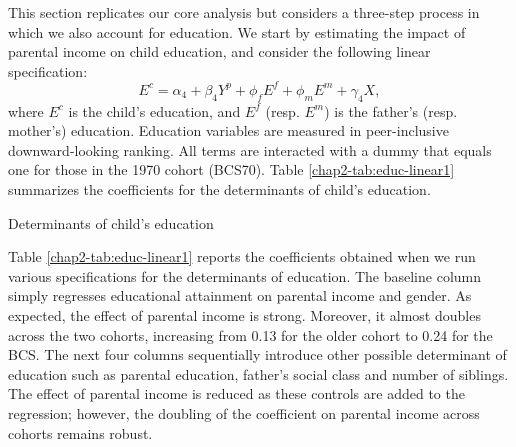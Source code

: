 This section replicates our core analysis but considers a three-step process in which we also account for education. We start by estimating the impact of parental income on child education, and consider the following linear specification:
\begin{equation}\label{chap2-eq:emp-educ0}
    E^c = \alpha_4 + \beta_4 Y^p + \phi_f E^f + \phi_m E^m + \gamma_4 X,
\end{equation}
where $E^c$ is the child's education, and $E^f$ (resp. $E^m$) is the father's (resp. mother's) education. Education variables are measured in peer-inclusive downward-looking ranking. All terms are
interacted with a dummy that equals one for those in the 1970 cohort (BCS70).
Table \ref{chap2-tab:educ-linear1} summarizes the coefficients for the determinants of child's education.
\begin{table}[!htb]
    \centering
    \caption{Determinants of child's education}
    \label{chap2-tab:educ-linear1}
\end{table}

Table \ref{chap2-tab:educ-linear1} reports the coefficients obtained when we run various specifications for the determinants of education. The baseline column simply regresses educational attainment on parental income and gender. As expected, the effect of parental income is strong. Moreover, it almost doubles across the two cohorts, increasing from 0.13 for the older cohort to 0.24 for the BCS. The next four columns sequentially introduce other possible determinant of education such as parental education, father's social class and number of siblings. The effect of parental income is reduced as these controls are added to the regression; however, the doubling of the coefficient on parental income across cohorts remains robust.   

